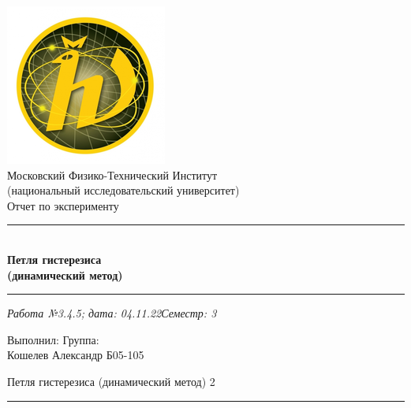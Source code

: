 \documentclass[12pt,a4paper]{scrartcl}
\begin{document}
	\begin{titlepage}
		
		\vspace*{\fill}
		
		\begin{center}
			\includegraphics[scale=0.8]{MIPT.png}
			\\[0.7cm]\Huge Московский Физико-Технический Институт\\(национальный исследовательский университет)
			\\[2cm]\LARGE Отчет по эксперименту
			\\[0.5cm]\noindent\rule{\textwidth}{1pt}
			\\\Huge\textbf{Петля гистерезиса\\(динамический метод)}
			\\[-0.5cm]\noindent\rule{\textwidth}{1pt}
		\end{center}
		
		\begin{flushleft}
			\textit{Работа №3.4.5; дата: 04.11.22}\hfill\textit{Семестр: 3}
		\end{flushleft}
		
		\vspace*{\fill}
		
		\begin{flushleft}
			Выполнил: \hspace{\fill} Группа:
			\\Кошелев Александр \hspace{\fill} Б05-105
		\end{flushleft}
	\end{titlepage}
	
	
	\begin{flushleft}
		\footnotesize{Петля гистерезиса (динамический метод)} \hspace{\fill} \footnotesize{2}
		\\[-0.3cm]\noindent\rule{\textwidth}{0.3pt}
	\end{flushleft}
	
\end{document}
